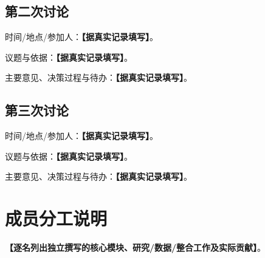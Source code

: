 \documentclass[UTF8,a4paper,11pt,oneside,fontset=fandol]{ctexart}
\newcommand{\fillin}[1]{\textcolor{promptgray}{\textbf{【#1】}}}
\begin{document}
\subsection*{第二次讨论}
\noindent 时间/地点/参加人：\fillin{据真实记录填写}。\par
\noindent 议题与依据：\fillin{据真实记录填写}。\par
\noindent 主要意见、决策过程与待办：\fillin{据真实记录填写}。\par
\subsection*{第三次讨论}
\noindent 时间/地点/参加人：\fillin{据真实记录填写}。\par
\noindent 议题与依据：\fillin{据真实记录填写}。\par
\noindent 主要意见、决策过程与待办：\fillin{据真实记录填写}。\par

\section{成员分工说明}
\noindent\fillin{逐名列出独立撰写的核心模块、研究/数据/整合工作及实际贡献}。
\fi
\end{document}
